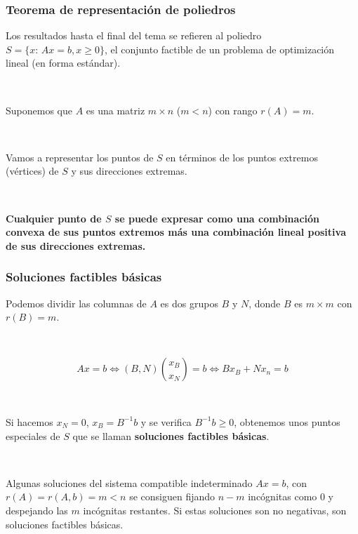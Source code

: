 \documentclass{beamer}
\begin{document}
\begin{frame}
\frametitle{Teorema de representación de poliedros}



Los resultados hasta el final del tema se refieren al poliedro $S=\{x:\, Ax=b, x\geq 0\}$, el conjunto factible de un problema de optimización lineal (en forma estándar).

\

Suponemos que $A$ es una matriz $m\times n$ ($m<n$) con rango $r(A)=m$. 


\

Vamos a representar los puntos de $S$ en términos de los puntos extremos (vértices) de $S$ y sus direcciones extremas.


\

\textbf{Cualquier punto de $S$ se puede expresar como una combinación convexa de sus puntos extremos más una combinación lineal positiva de sus direcciones extremas.}




\end{frame}
\begin{frame}
\frametitle{Soluciones factibles básicas}

Podemos dividir las columnas de $A$ es dos grupos $B$ y $N$, donde $B$ es $m\times m$ con $r(B)=m$.

\

\[
Ax=b \Leftrightarrow (B,N) {x_B \choose x_N}=b \Leftrightarrow B x_B + Nx_n = b 
\]

\

Si hacemos $x_N=0$, $x_B=B^{-1}b$ y se verifica $B^{-1}b\geq 0$, obtenemos unos puntos especiales de $S$ que se llaman  \textbf{soluciones factibles básicas}.

\


Algunas soluciones del sistema compatible indeterminado $Ax=b$, con $r(A)=r(A,b)=m<n$ se consiguen fijando $n-m$ incógnitas como 0 y despejando las $m$ incógnitas restantes. Si estas soluciones son no negativas, son soluciones factibles básicas.
 
\end{frame}
\end{document}
